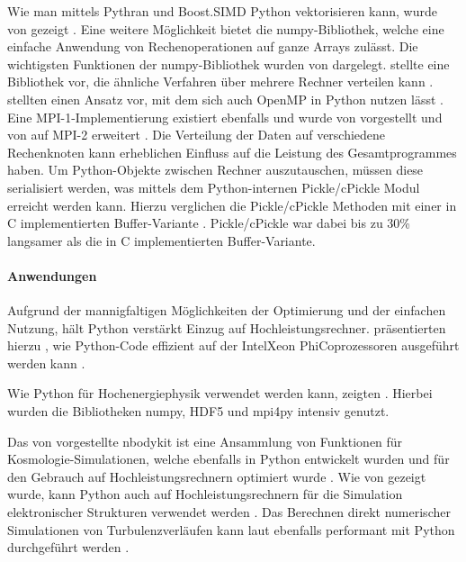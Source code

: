 Wie man mittels Pythran und Boost.SIMD Python vektorisieren kann, wurde \citeyear{GFB14} von \citeauthor{GFB14} gezeigt \cite{GFB14}. Eine weitere Möglichkeit bietet die numpy-Bibliothek, welche eine einfache Anwendung von Rechenoperationen auf ganze Arrays zulässt. Die wichtigsten Funktionen der numpy-Bibliothek wurden von \citeauthor{VCV11} dargelegt. \citeauthor{Dai09} stellte \citeyear{Dai09} eine Bibliothek vor, die ähnliche Verfahren über mehrere Rechner verteilen kann \cite{Dai09}.
\citeauthor{GBA13} stellten \citeyear{GBA13} einen Ansatz vor, mit dem sich auch OpenMP in Python nutzen lässt \cite{GBA13}. Eine MPI-1-Implementierung existiert ebenfalls und wurde \citeyear{DPS05} von \citeauthor{DPS05} vorgestellt und \citeyear{DPS+08} von \citeauthor{DPS+08} auf MPI-2 erweitert \cite{DPS05,DPS+08}.
Die Verteilung der Daten auf verschiedene Rechenknoten kann erheblichen Einfluss auf die Leistung des Gesamtprogrammes haben. Um Python-Objekte zwischen Rechner auszutauschen, müssen diese serialisiert werden, was mittels dem Python-internen Pickle/cPickle Modul erreicht werden kann. Hierzu verglichen \citeauthor{DPK+11} die Pickle/cPickle Methoden mit einer in C implementierten Buffer-Variante \cite{DPK+11}. Pickle/cPickle war dabei bis zu 30\% langsamer als die in C implementierten Buffer-Variante. 

\paragraph{Anwendungen}

Aufgrund der mannigfaltigen Möglichkeiten der Optimierung und der einfachen Nutzung, hält Python verstärkt Einzug auf Hochleistungsrechner. \citeauthor{KE14} präsentierten hierzu \citeyear{KE14}, wie Python-Code effizient auf der Intel\textregistered Xeon Phi\texttrademark Coprozessoren ausgeführt werden kann \cite{KE14}.

Wie Python für Hochenergiephysik verwendet werden kann, zeigten \citeauthor{SKP+17} \cite{SKP+17}. Hierbei wurden die Bibliotheken numpy, HDF5 und mpi4py intensiv genutzt.

Das von \citeauthor{HF17} vorgestellte nbodykit ist eine Ansammlung von Funktionen für Kosmologie-Simulationen, welche ebenfalls in Python entwickelt wurden und für den Gebrauch auf Hochleistungsrechnern optimiert wurde \cite{HF17}. Wie \citeyear{ERS+11} von \citeauthor{ERS+11} gezeigt wurde, kann Python auch auf Hochleistungsrechnern für die Simulation elektronischer Strukturen verwendet werden \cite{ERS+11}. Das Berechnen direkt numerischer Simulationen von Turbulenzverläufen kann laut \citeauthor{ML16} ebenfalls performant mit Python durchgeführt werden \cite{ML16}.

